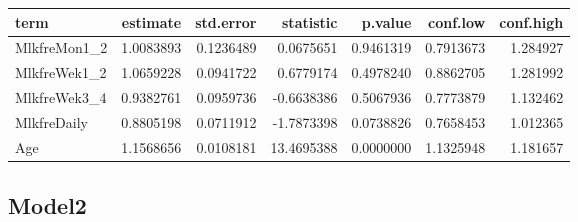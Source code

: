 \documentclass[
]{article}
\newenvironment{Shaded}{\begin{snugshade}}{\end{snugshade}}
\newcommand{\DataTypeTok}[1]{\textcolor[rgb]{0.13,0.29,0.53}{#1}}
\newcommand{\KeywordTok}[1]{\textcolor[rgb]{0.13,0.29,0.53}{\textbf{#1}}}
\newcommand{\NormalTok}[1]{#1}
\newcommand{\OperatorTok}[1]{\textcolor[rgb]{0.81,0.36,0.00}{\textbf{#1}}}
\newcommand{\OtherTok}[1]{\textcolor[rgb]{0.56,0.35,0.01}{#1}}
\newcommand{\StringTok}[1]{\textcolor[rgb]{0.31,0.60,0.02}{#1}}
\begin{document}
\begin{longtable}[]{@{}lrrrrrr@{}}
\toprule
term & estimate & std.error & statistic & p.value & conf.low &
conf.high\tabularnewline
\midrule
\endhead
MlkfreMon1\_2 & 1.0083893 & 0.1236489 & 0.0675651 & 0.9461319 &
0.7913673 & 1.284927\tabularnewline
MlkfreWek1\_2 & 1.0659228 & 0.0941722 & 0.6779174 & 0.4978240 &
0.8862705 & 1.281992\tabularnewline
MlkfreWek3\_4 & 0.9382761 & 0.0959736 & -0.6638386 & 0.5067936 &
0.7773879 & 1.132462\tabularnewline
MlkfreDaily & 0.8805198 & 0.0711912 & -1.7873398 & 0.0738826 & 0.7658453
& 1.012365\tabularnewline
Age & 1.1568656 & 0.0108181 & 13.4695388 & 0.0000000 & 1.1325948 &
1.181657\tabularnewline
\bottomrule
\end{longtable}

\hypertarget{model2-2}{%
\subsection{Model2}\label{model2-2}}

\begin{Shaded}
\end{Shaded}
\end{document}
